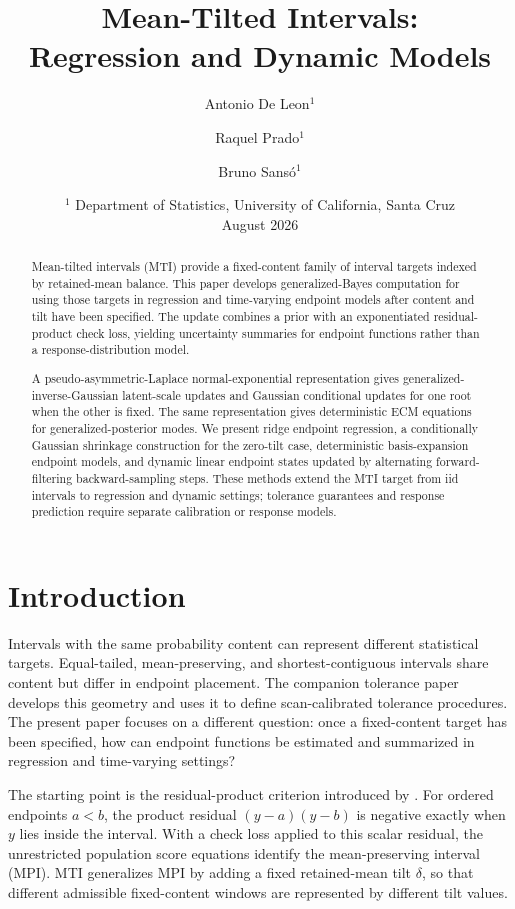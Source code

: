 \documentclass[11pt]{article}
\title{\vspace{-0.6cm}Mean-Tilted Intervals:\\
Regression and Dynamic Models}
\author{Antonio De Leon$^{1}$ \and Raquel Prado$^{1}$ \and Bruno Sans\'o$^{1}$}
\date{\small $^{1}$ Department of Statistics, University of California, Santa Cruz\\
\vspace{0.25em}August 2026}
\numberwithin{equation}{section}
\begin{document}
\maketitle
\vspace{-1.25em}

\begin{abstract}
\noindent
Mean-tilted intervals (MTI) provide a fixed-content family of interval targets
indexed by retained-mean balance. This paper develops generalized-Bayes
computation for using those targets in regression and time-varying endpoint
models after content and tilt have been specified. The update combines a prior
with an exponentiated residual-product check loss, yielding uncertainty
summaries for endpoint functions rather than a response-distribution model.

A pseudo-asymmetric-Laplace normal-exponential representation gives
generalized-inverse-Gaussian latent-scale updates and Gaussian conditional
updates for one root when the other is fixed. The same representation gives
deterministic ECM equations for generalized-posterior modes. We present ridge
endpoint regression, a conditionally Gaussian shrinkage construction for the
zero-tilt case, deterministic basis-expansion endpoint models, and dynamic linear
endpoint states updated by alternating forward-filtering backward-sampling
steps. These methods extend the MTI target from iid intervals to regression and
dynamic settings; tolerance guarantees and response prediction require
separate calibration or response models.
\end{abstract}

\section{Introduction}
\label{sec:introduction}

Intervals with the same probability content can represent different statistical
targets. Equal-tailed, mean-preserving, and shortest-contiguous intervals share
content but differ in endpoint placement. The companion tolerance paper
develops this geometry and uses it to define scan-calibrated tolerance
procedures.
The present paper focuses on a different question: once a fixed-content target
has been specified, how can endpoint functions be estimated and summarized in
regression and time-varying settings?

The starting point is the residual-product criterion introduced by
\citet{PouplinEtAl2024RQR}. For ordered endpoints \(a<b\), the product
residual \((y-a)(y-b)\) is negative exactly when \(y\) lies inside the interval.
With a check loss applied to this scalar residual, the unrestricted population
score equations identify the mean-preserving interval (MPI). MTI generalizes
MPI by adding a fixed retained-mean tilt \(\delta\), so that different
admissible fixed-content windows are represented by different tilt values.
\end{document}
